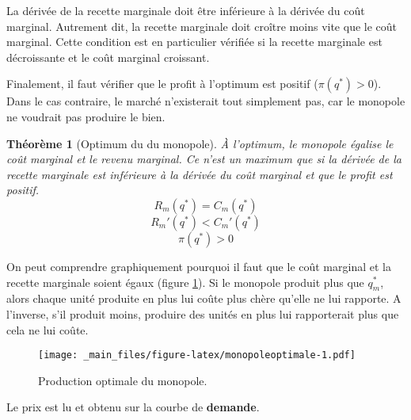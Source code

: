 \documentclass[
]{book}
\newtheorem{theorem}{Théorème}[chapter]
\theoremstyle{definition}
\theoremstyle{definition}
\theoremstyle{definition}
\theoremstyle{definition}
\theoremstyle{remark}
\begin{document}
La dérivée de la recette marginale doit être inférieure à la dérivée du coût marginal.
Autrement dit, la recette marginale doit croître moins vite que le coût marginal.
Cette condition est en particulier vérifiée si la recette marginale est décroissante et le coût marginal croissant.

Finalement, il faut vérifier que le profit à l'optimum est positif (\(\pi(q^*)>0\)).
Dans le cas contraire, le marché n'existerait tout simplement pas, car le monopole ne voudrait pas produire le bien.

\begin{theorem}[Optimum du du monopole]
À l'optimum, le monopole égalise le coût marginal et le revenu marginal.
Ce n'est un maximum que si la dérivée de la recette marginale est inférieure à la dérivée du coût marginal et que le profit est positif.
\begin{equation}
R_m(q^*)=C_m(q^*) 
\label{eq:cpo}
\end{equation}
\begin{equation}
R_m'(q^*) <C_m'(q^*) \label{eq:cso}
\end{equation}
\begin{equation}
\pi(q^*)>0 \label{eq:profitpos}
\end{equation}
\end{theorem}

On peut comprendre graphiquement pourquoi il faut que le coût marginal et la recette marginale soient égaux (figure \ref{fig:monopoleoptimale}).
Si le monopole produit plus que \(q_m^*\), alors chaque unité produite en plus lui coûte plus chère qu'elle ne lui rapporte.
A l'inverse, s'il produit moins, produire des unités en plus lui rapporterait plus que cela ne lui coûte.

\begin{figure}
\centering
\texttt{[image: \_main\_files/figure-latex/monopoleoptimale-1.pdf]}
\caption{\label{fig:monopoleoptimale}Production optimale du monopole.}
\end{figure}

Le prix est lu et obtenu sur la courbe de \textbf{demande}.
\end{document}
